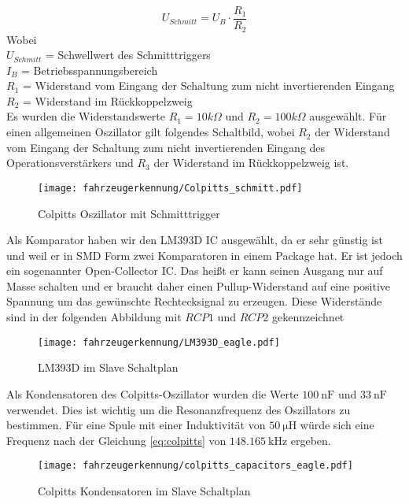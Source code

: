 \begin{equation} \label{eq:schmitt}
    U_{Schmitt} = U_{B} \cdot \frac{R_{1}}{R_{2}}
\end{equation}
Wobei \\
$U_{Schmitt}$ = Schwellwert des Schmitttriggers\\
$I_{B}$ = Betriebsspannungsbereich\\
$R_{1}$ = Widerstand vom Eingang der Schaltung zum nicht invertierenden Eingang\\
$R_{2}$ = Widerstand im Rückkoppelzweig\\

Es wurden die Widerstandswerte $R_{1} = 10k\Omega$ und $R_{2} = 100k\Omega$ ausgewählt. Für einen allgemeinen Oszillator gilt folgendes Schaltbild, wobei $R_{2}$ der Widerstand vom Eingang der Schaltung zum nicht invertierenden Eingang des Operationsverstärkers und
$R_{3}$ der Widerstand im Rückkoppelzweig ist.

\begin{figure}[H]
    \centering
    \texttt{[image: fahrzeugerkennung/Colpitts\_schmitt.pdf]}
    \caption{Colpitts Oszillator mit Schmitttrigger}
\end{figure}

Als Komparator haben wir den LM393D IC ausgewählt, da er sehr günstig ist und weil er in SMD Form zwei Komparatoren in einem Package hat. Er ist jedoch ein sogenannter Open-Collector IC. Das heißt er kann seinen Ausgang nur auf Masse schalten und er braucht daher 
einen Pullup-Widerstand auf eine positive Spannung um das gewünschte Rechtecksignal zu erzeugen. Diese Widerstände sind in der folgenden Abbildung mit $RCP1$ und $RCP2$ gekennzeichnet

\begin{figure}[H]
    \centering
    \texttt{[image: fahrzeugerkennung/LM393D\_eagle.pdf]}
    \caption{LM393D im Slave Schaltplan}
\end{figure}

Als Kondensatoren des Colpitts-Oszillator wurden die Werte $\SI{100}{\nano\farad}$ und $\SI{33}{\nano\farad}$ verwendet. Dies ist wichtig um die Resonanzfrequenz des Oszillators zu bestimmen.
Für eine Spule mit einer Induktivität von $\SI{50}{\micro\henry}$ würde sich eine Frequenz nach der Gleichung \ref{eq:colpitts} von $\SI{148,165}{\kilo\hertz}$ ergeben. 

\begin{figure}[H]
    \centering
    \texttt{[image: fahrzeugerkennung/colpitts\_capacitors\_eagle.pdf]}
    \caption{Colpitts Kondensatoren im Slave Schaltplan}
\end{figure}

